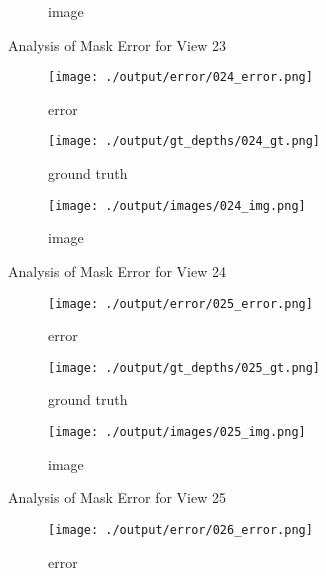 \documentclass{article}
\begin{document}
\begin{figure}
\begin{subfigure}{0.3\textwidth}
		\caption{image}
		\label{fig:img23}
	\end{subfigure}
	\hfill
	\caption{Analysis of Mask Error for View 23}
	\label{fig:error_analys23}
\end{figure}\begin{figure}
	\centering
	\begin{subfigure}{0.3\textwidth}
		\centering
		\texttt{[image: ./output/error/024\_error.png]}
		\caption{error}
		\label{fig:error24}
	\end{subfigure}
	\hfill
	\centering
	\begin{subfigure}{0.3\textwidth}
		\centering
		\texttt{[image: ./output/gt\_depths/024\_gt.png]}
		\caption{ground truth}
		\label{fig:gt24}
	\end{subfigure}
	\hfill
	\centering
	\begin{subfigure}{0.3\textwidth}
		\centering
		\texttt{[image: ./output/images/024\_img.png]}
		\caption{image}
		\label{fig:img24}
	\end{subfigure}
	\hfill
	\caption{Analysis of Mask Error for View 24}
	\label{fig:error_analys24}
\end{figure}\begin{figure}
	\centering
	\begin{subfigure}{0.3\textwidth}
		\centering
		\texttt{[image: ./output/error/025\_error.png]}
		\caption{error}
		\label{fig:error25}
	\end{subfigure}
	\hfill
	\centering
	\begin{subfigure}{0.3\textwidth}
		\centering
		\texttt{[image: ./output/gt\_depths/025\_gt.png]}
		\caption{ground truth}
		\label{fig:gt25}
	\end{subfigure}
	\hfill
	\centering
	\begin{subfigure}{0.3\textwidth}
		\centering
		\texttt{[image: ./output/images/025\_img.png]}
		\caption{image}
		\label{fig:img25}
	\end{subfigure}
	\hfill
	\caption{Analysis of Mask Error for View 25}
	\label{fig:error_analys25}
\end{figure}\begin{figure}
	\centering
	\begin{subfigure}{0.3\textwidth}
		\centering
		\texttt{[image: ./output/error/026\_error.png]}
		\caption{error}
		\label{fig:error26}
	\end{subfigure}
	\hfill
	\centering
	\begin{subfigure}{0.3\textwidth}

\end{subfigure}
\end{figure}
\end{document}
